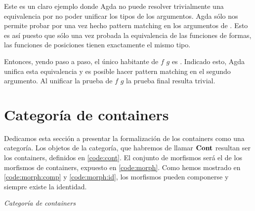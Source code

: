Este es un claro ejemplo donde Agda no puede resolver trivialmente una equivalencia por no poder unificar los tipos de los argumentos.
Agda sólo nos permite probar por  una vez hecho pattern matching en los argumentos de .
Esto es así puesto que sólo una vez probada la equivalencia de las funciones de formas, las funciones de posiciones tienen exactamente el mismo tipo.

Entonces, yendo paso a paso, el único habitante de \mSh $f$ \AgdaFunction{$\cong$} \mSh $g$ es . Indicado esto, Agda unifica esta equivalencia y es posible hacer pattern matching en el segundo argumento. Al unificar la prueba de \mPos $f$ \AgdaFunction{$\cong$} \mPos $g$ la prueba final resulta trivial. 


\section{Categoría de containers}\label{cont:cat}

Dedicamos esta sección a presentar la formalización de los containers como una categoría. Los objetos de la categoría, que habremos de llamar $\mathbf{Cont}$ resultan ser los containers, definidos en \ref{code:cont}. El conjunto de morfismos será el de los morfismos de containers, expuesto en \ref{code:morph}. Como hemos mostrado en \ref{code:morph:comp} y \ref{code:morph:id}, los morfismos pueden componerse y siempre existe la identidad.

\begin{agdacode}\label{code:cont:cat}{\it Categoría de containers}

\end{agdacode}
